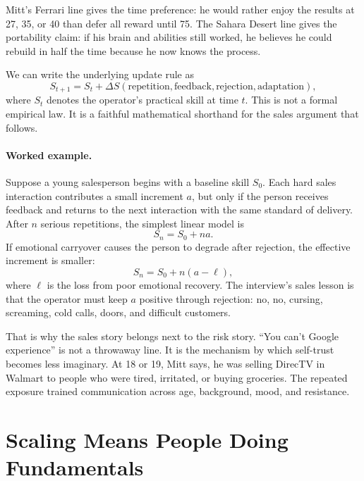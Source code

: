 Mitt's Ferrari line gives the time preference: he would rather enjoy the results at 27, 35, or 40 than defer all reward until 75. The Sahara Desert line gives the portability claim: if his brain and abilities still worked, he believes he could rebuild in half the time because he now knows the process.

We can write the underlying update rule as
\begin{equation}
S_{t+1}=S_t+\Delta S(\text{repetition},\text{feedback},\text{rejection},\text{adaptation}),
\end{equation}
where \(S_t\) denotes the operator's practical skill at time \(t\). This is not a formal empirical law. It is a faithful mathematical shorthand for the sales argument that follows.

\paragraph{Worked example.}
Suppose a young salesperson begins with a baseline skill \(S_0\). Each hard sales interaction contributes a small increment \(a\), but only if the person receives feedback and returns to the next interaction with the same standard of delivery. After \(n\) serious repetitions, the simplest linear model is
\begin{equation}
S_n = S_0 + na.
\end{equation}
If emotional carryover causes the person to degrade after rejection, the effective increment is smaller:
\begin{equation}
S_n = S_0 + n(a-\ell),
\end{equation}
where \(\ell\) is the loss from poor emotional recovery. The interview's sales lesson is that the operator must keep \(a\) positive through rejection: no, no, cursing, screaming, cold calls, doors, and difficult customers.

That is why the sales story belongs next to the risk story. ``You can't Google experience'' is not a throwaway line. It is the mechanism by which self-trust becomes less imaginary. At 18 or 19, Mitt says, he was selling DirecTV in Walmart to people who were tired, irritated, or buying groceries. The repeated exposure trained communication across age, background, mood, and resistance.

\section{Scaling Means People Doing Fundamentals}

